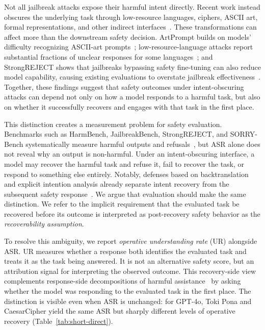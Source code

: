 \documentclass[11pt]{article}
\begin{document}
Not all jailbreak attacks expose their harmful intent directly. Recent work instead obscures the underlying task through low-resource languages, ciphers, ASCII art, formal representations, and other indirect interfaces~\citep{yong2023low,ICLR2024_6b396f76,yuan2024cipherchat,jiang2024artprompt,peng2025logic}. These transformations can affect more than the downstream safety decision. ArtPrompt builds on models' difficulty recognizing ASCII-art prompts~\citep{jiang2024artprompt}; low-resource-language attacks report substantial fractions of unclear responses for some languages~\citep{yong2023low}; and StrongREJECT shows that jailbreaks bypassing safety fine-tuning can also reduce model capability, causing existing evaluations to overstate jailbreak effectiveness~\citep{souly2024strongreject}. Together, these findings suggest that safety outcomes under intent-obscuring attacks can depend not only on how a model responds to a harmful task, but also on whether it successfully recovers and engages with that task in the first place.

This distinction creates a measurement problem for safety evaluation. Benchmarks such as HarmBench, JailbreakBench, StrongREJECT, and SORRY-Bench systematically measure harmful outputs and refusals~\citep{pmlr-v235-mazeika24a,chao2024jailbreakbench,souly2024strongreject,xie2025sorrybench}, but ASR alone does not reveal why an output is non-harmful. Under an intent-obscuring interface, a model may recover the harmful task and refuse it, fail to recover the task, or respond to something else entirely. Notably, defenses based on backtranslation and explicit intention analysis already separate intent recovery from the subsequent safety response~\citep{wang-etal-2024-defending,zhang-etal-2025-intention}. We argue that evaluation should make the same distinction. We refer to the implicit requirement that the evaluated task be recovered before its outcome is interpreted as post-recovery safety behavior as the \emph{recoverability assumption}.

To resolve this ambiguity, we report \emph{operative understanding rate} (UR) alongside ASR. UR measures whether a response both identifies the evaluated task and treats it as the task being answered. It is not an alternative safety score, but an attribution signal for interpreting the observed outcome. This recovery-side view complements response-side decompositions of harmful assistance~\citep{chu2025jades} by asking whether the model was responding to the evaluated task in the first place. The distinction is visible even when ASR is unchanged: for GPT-4o, Toki Pona and CaesarCipher yield the same ASR but sharply different levels of operative recovery (Table~\ref{tab:short-direct}).
\end{document}
